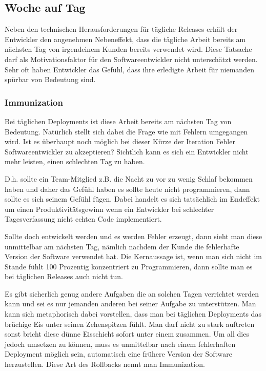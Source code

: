 \subsection{Woche auf Tag}
\label{subsec:subscription-modell}

Neben den technischen Herausforderungen für tägliche Releases erhält der
Entwickler den angenehmen Nebeneffekt, dass die tägliche Arbeit bereits am
nächsten Tag von irgendeinem Kunden bereits verwendet wird. Diese Tatsache
darf als Motivationsfaktor für den Softwareentwickler nicht unterschätzt
werden. Sehr oft haben Entwickler das Gefühl, dass ihre erledigte Arbeit für
niemanden spürbar von Bedeutung sind.

\subsubsection{Immunization}
\label{minisec:immunization}
Bei täglichen Deployments ist diese Arbeit bereits am nächsten Tag von
Bedeutung. Natürlich stellt sich dabei die Frage wie mit Fehlern umgegangen
wird. Ist es überhaupt noch möglich bei dieser Kürze der Iteration Fehler
Softwareentwickler zu akzeptieren? Sichtlich kann es sich ein Entwickler nicht
mehr leisten, einen schlechten Tag zu haben.

D.h. sollte ein Team-Mitglied z.B. die Nacht zu vor zu wenig Schlaf bekommen
haben und daher das Gefühl haben es sollte heute nicht programmieren, dann
sollte es sich seinem Gefühl fügen. Dabei handelt es sich tatsächlich im
Endeffekt um einen Produktivitätsgewinn wenn ein Entwickler bei schlechter
Tagesverfassung nicht echten Code implementiert.

Sollte doch entwickelt werden und es werden Fehler erzeugt, dann sieht man
diese unmittelbar am nächsten Tag, nämlich nachdem der Kunde die fehlerhafte
Version der Software verwendet hat. Die Kernaussage ist, wenn man sich nicht
im Stande fühlt 100 Prozentig konzentriert zu Programmieren, dann sollte man
es bei täglichen Releases auch nicht tun.

Es gibt sicherlich genug andere Aufgaben die an solchen Tagen verrichtet
werden kann und sei es nur jemanden anderen bei seiner Aufgabe zu
unterstützen. Man kann sich metaphorisch dabei vorstellen, dass man bei
täglichen Deployments das brüchige Eis unter seinen Zehenspitzen fühlt. Man
darf nicht zu stark auftreten sonst bricht diese dünne Eisschicht sofort unter
einem zusammen. Um all dies jedoch umsetzen zu können, muss es unmittelbar
nach einem fehlerhaften Deployment möglich sein, automatisch eine frühere
Version der Software herzustellen. Diese Art des Rollbacks nennt man
Immunization.

